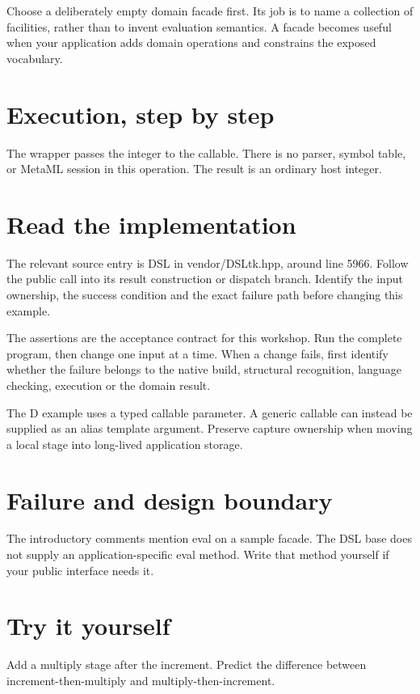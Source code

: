 \clearpage
{}
Choose a deliberately empty domain facade first. Its job is to name a collection of facilities, rather than to invent evaluation semantics. A facade becomes useful when your application adds domain operations and constrains the exposed vocabulary.


\section*{Execution, step by step}
The wrapper passes the integer to the callable. There is no parser, symbol table, or MetaML session in this operation. The result is an ordinary host integer.

\section*{Read the implementation}
The relevant source entry is DSL in vendor/DSLtk.hpp, around line 5966. Follow the public call into its result construction or dispatch branch. Identify the input ownership, the success condition and the exact failure path before changing this example.

The assertions are the acceptance contract for this workshop. Run the complete program, then change one input at a time. When a change fails, first identify whether the failure belongs to the native build, structural recognition, language checking, execution or the domain result.

\clearpage
{}
The D example uses a typed callable parameter. A generic callable can instead be supplied as an alias template argument. Preserve capture ownership when moving a local stage into long-lived application storage.


\section*{Failure and design boundary}
The introductory comments mention eval on a sample facade. The DSL base does not supply an application-specific eval method. Write that method yourself if your public interface needs it.

\section*{Try it yourself}
Add a multiply stage after the increment. Predict the difference between increment-then-multiply and multiply-then-increment.

